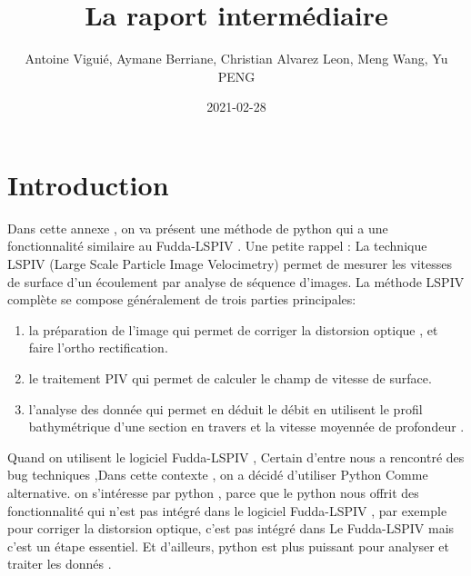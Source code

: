 \documentclass[
]{article}
\title{La raport intermédiaire}
\author{Antoine Viguié, Aymane Berriane, Christian Alvarez Leon, Meng Wang, Yu PENG}
\date{2021-02-28}
\begin{document}






{
\setcounter{tocdepth}{2}
\tableofcontents
}


\newpage

\hypertarget{introduction}{%
\section*{Introduction}\label{introduction}}

Dans cette annexe , on va présent une méthode de python qui a une fonctionnalité similaire au Fudda-LSPIV . Une petite rappel : La technique LSPIV (Large Scale Particle Image Velocimetry) permet de mesurer les vitesses de surface d'un écoulement par analyse de séquence d'images. La méthode LSPIV complète se compose généralement de trois parties
principales:

\begin{enumerate}
\def\labelenumi{\arabic{enumi}.}
\item
  la préparation de l'image qui permet de corriger la distorsion optique , et faire l'ortho rectification.
\item
  le traitement PIV qui permet de calculer le champ de vitesse de surface.
\item
  l'analyse des donnée qui permet en déduit le débit en utilisent le profil bathymétrique d'une section en travers et la vitesse moyennée de profondeur .
\end{enumerate}

Quand on utilisent le logiciel Fudda-LSPIV , Certain d'entre nous a rencontré des bug techniques ,Dans cette contexte , on a décidé d'utiliser Python Comme alternative. on s'intéresse par python , parce que le python nous offrit des fonctionnalité qui n'est pas intégré dans le logiciel Fudda-LSPIV , par exemple pour corriger la distorsion optique, c'est pas intégré dans Le Fudda-LSPIV mais c'est un étape essentiel. Et d'ailleurs, python est plus puissant pour analyser et traiter les donnés .
\end{document}
